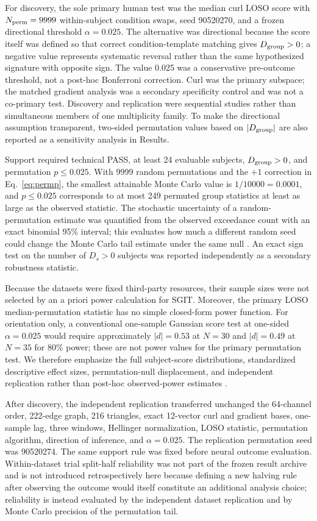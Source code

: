 \documentclass[12pt]{article}
\begin{document}
For discovery, the sole primary human test was the median curl LOSO score with $N_{\rm perm}=9999$ within-subject condition swaps, seed 90520270, and a frozen directional threshold $\alpha=0.025$. The alternative was directional because the score itself was defined so that correct condition-template matching gives $D_{\rm group}>0$; a negative value represents systematic reversal rather than the same hypothesized signature with opposite sign. The value 0.025 was a conservative pre-outcome threshold, not a post-hoc Bonferroni correction. Curl was the primary subspace; the matched gradient analysis was a secondary specificity control and was not a co-primary test. Discovery and replication were sequential studies rather than simultaneous members of one multiplicity family. To make the directional assumption transparent, two-sided permutation values based on $|D_{\rm group}|$ are also reported as a sensitivity analysis in Results.

Support required technical PASS, at least 24 evaluable subjects, $D_{\rm group}>0$, and permutation $p\le0.025$. With 9999 random permutations and the $+1$ correction in Eq.~\ref{eq:permp}, the smallest attainable Monte Carlo value is $1/10000=0.0001$, and $p\le0.025$ corresponds to at most 249 permuted group statistics at least as large as the observed statistic. The stochastic uncertainty of a random-permutation estimate was quantified from the observed exceedance count with an exact binomial 95\% interval; this evaluates how much a different random seed could change the Monte Carlo tail estimate under the same null \citep{PhipsonSmyth2010}. An exact sign test on the number of $D_s>0$ subjects was reported independently as a secondary robustness statistic.

Because the datasets were fixed third-party resources, their sample sizes were not selected by an a priori power calculation for SGIT. Moreover, the primary LOSO median-permutation statistic has no simple closed-form power function. For orientation only, a conventional one-sample Gaussian score test at one-sided $\alpha=0.025$ would require approximately $|d|=0.53$ at $N=30$ and $|d|=0.49$ at $N=35$ for 80\% power; these are not power values for the primary permutation test. We therefore emphasize the full subject-score distributions, standardized descriptive effect sizes, permutation-null displacement, and independent replication rather than post-hoc observed-power estimates \citep{Lakens2013}.

After discovery, the independent replication transferred unchanged the 64-channel order, 222-edge graph, 216 triangles, exact 12-vector curl and gradient bases, one-sample lag, three windows, Hellinger normalization, LOSO statistic, permutation algorithm, direction of inference, and $\alpha=0.025$. The replication permutation seed was 90520274. The same support rule was fixed before neural outcome evaluation. Within-dataset trial split-half reliability was not part of the frozen result archive and is not introduced retrospectively here because defining a new halving rule after observing the outcome would itself constitute an additional analysis choice; reliability is instead evaluated by the independent dataset replication and by Monte Carlo precision of the permutation tail.
\end{document}
